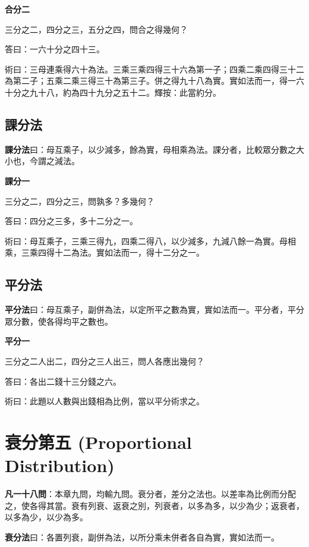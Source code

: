 \documentclass[11pt,a4paper]{article}
\newenvironment{problemenv}[1]{%
  \medskip\noindent\textbf{#1}\par\nopagebreak\smallskip
}{\medskip}
\begin{document}
\begin{problemenv}{合分二}
三分之二，四分之三，五分之四，問合之得幾何？

\textsf{答曰：}一六十分之四十三。

\textsf{術曰：}三母連乘得六十為法。三乘三乘四得三十六為第一子；四乘二乘四得三十二為第二子；五乘二乘三得三十為第三子。併之得九十八為實。實如法而一，得一六十分之九十八，約為四十九分之五十二。輝按：此當約分。
\end{problemenv}

\subsection{課分法}

\textbf{課分法}曰：母互乘子，以少減多，餘為實，母相乘為法。課分者，比較眾分數之大小也，今謂之減法。

\begin{problemenv}{課分一}
三分之二，四分之三，問孰多？多幾何？

\textsf{答曰：}四分之三多，多十二分之一。

\textsf{術曰：}母互乘子，三乘三得九，四乘二得八，以少減多，九減八餘一為實。母相乘，三乘四得十二為法。實如法而一，得十二分之一。
\end{problemenv}

\subsection{平分法}

\textbf{平分法}曰：母互乘子，副併為法，以定所平之數為實，實如法而一。平分者，平分眾分數，使各得均平之數也。

\begin{problemenv}{平分一}
三分之二人出二，四分之三人出三，問人各應出幾何？

\textsf{答曰：}各出二錢十三分錢之六。

\textsf{術曰：}此題以人數與出錢相為比例，當以平分術求之。
\end{problemenv}

\newpage
\section{衰分第五 (Proportional Distribution)}

\textbf{凡一十八問}：本章九問，均輸九問。衰分者，差分之法也。以差率為比例而分配之，使各得其當。衰有列衰、返衰之別，列衰者，以多為多，以少為少；返衰者，以多為少，以少為多。

\textbf{衰分法}曰：各置列衰，副併為法，以所分乘未併者各自為實，實如法而一。
\end{document}
